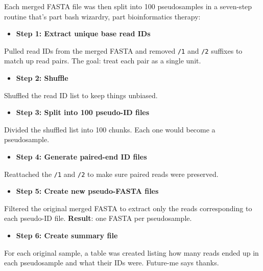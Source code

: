 \documentclass[
]{book}
\providecommand{\tightlist}{%
  \setlength{\itemsep}{0pt}\setlength{\parskip}{0pt}}
\begin{document}
Each merged FASTA file was then split into 100 pseudosamples in a seven-step routine that's part bash wizardry, part bioinformatics therapy:

\begin{itemize}
\tightlist
\item
  \textbf{Step 1: Extract unique base read IDs}
\end{itemize}

Pulled read IDs from the merged FASTA and removed \texttt{/1} and \texttt{/2} suffixes to match up read pairs. The goal: treat each pair as a single unit.

\begin{itemize}
\tightlist
\item
  \textbf{Step 2: Shuffle}
\end{itemize}

Shuffled the read ID list to keep things unbiased.

\begin{itemize}
\tightlist
\item
  \textbf{Step 3: Split into 100 pseudo-ID files}
\end{itemize}

Divided the shuffled list into 100 chunks. Each one would become a pseudosample.

\begin{itemize}
\tightlist
\item
  \textbf{Step 4: Generate paired-end ID files}
\end{itemize}

Reattached the \texttt{/1} and \texttt{/2} to make sure paired reads were preserved.

\begin{itemize}
\tightlist
\item
  \textbf{Step 5: Create new pseudo-FASTA files}
\end{itemize}

Filtered the original merged FASTA to extract only the reads corresponding to each pseudo-ID file. \textbf{Result}: one FASTA per pseudosample.

\begin{itemize}
\tightlist
\item
  \textbf{Step 6: Create summary file}
\end{itemize}

For each original sample, a table was created listing how many reads ended up in each pseudosample and what their IDs were. Future-me says thanks.
\end{document}
